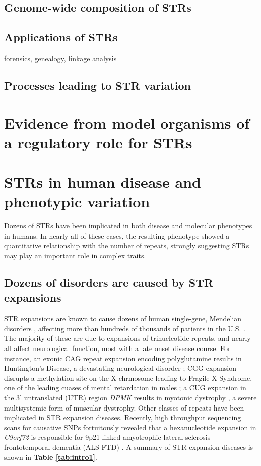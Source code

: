 \subsection{Genome-wide composition of STRs}
\subsection{Applications of STRs}
forensics, genealogy, linkage analysis
\subsection{Processes leading to STR variation}

\section{Evidence from model organisms of a regulatory role for STRs}

\section{STRs in human disease and phenotypic variation}
Dozens of STRs have been implicated in both disease and molecular phenotypes in humans. In nearly all of these cases, the resulting phenotype showed a quantitative relationship with the number of repeats, strongly suggesting STRs may play an important role in complex traits.

\subsection{Dozens of disorders are caused by STR expansions}
STR expansions are known to cause dozens of human single-gene, Mendelian disorders \cite{Mirkin2007}, affecting more than hundreds of thousands of patients in the U.S. \cite{CoffeeKeithAlbizuaEtAl2009}. The majority of these are due to expansions of trinucleotide repeats, and nearly all affect neurological function, most with a late onset disease course. For instance, an exonic CAG repeat expansion encoding polyglutamine results in Huntington's Disease, a devastating neurological disorder \cite{Mirkin2007}; CGG expansion disrupts a methylation site on the X chrmosome leading to Fragile X Syndrome, one of the leading cuases of mental retardation in males \cite{LyonLaverYuEtAl2010}; a CUG expansion in the 3' untranslated (UTR) region \emph{DPMK} results in myotonic dystrophy \cite{BrookMcCurrachHarleyEtAl1992}, a severe multisystemic form of muscular dystrophy. 
Other classes of repeats have been implicated in STR expansion diseases. Recently, high throughput sequencing scans for causative SNPs fortuitously revealed that a hexanucleotide expansion in \emph{C9orf72} is responsible for 9p21-linked amyotrophic lateral sclerosis-frontotemporal dementia (ALS-FTD) \cite{RentonMajounieWaiteEtAl}. A summary of STR expansion diseases is shown in \textbf{Table \ref{tab:intro1}}.

